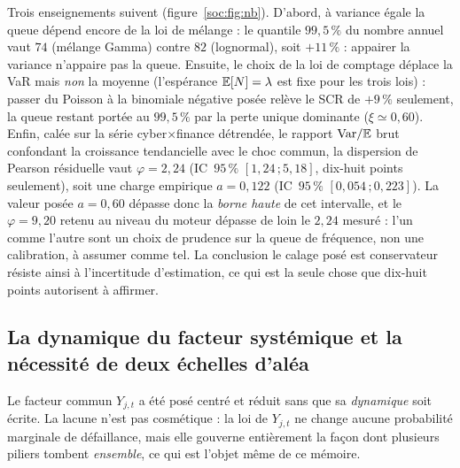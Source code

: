 Trois enseignements suivent (figure~\ref{soc:fig:nb}). D'abord, à variance égale la queue
dépend encore de la loi de mélange : le quantile $99{,}5\,\%$ du nombre annuel vaut $74$
(mélange Gamma) contre $82$ (lognormal), soit $+11\,\%$ : appairer la variance n'appaire pas
la queue. Ensuite, le choix de la loi de comptage déplace la VaR mais \emph{non} la moyenne
(l'espérance $\mathbb{E}[N]=\lambda$ est fixe pour les trois lois) : passer du Poisson à la binomiale
négative posée relève le SCR de $+9\,\%$ seulement, la queue restant portée au $99{,}5\,\%$ par
la perte unique dominante ($\xi\simeq 0{,}60$). Enfin, calée sur la série cyber$\times$finance
détrendée, le rapport $\mathrm{Var}/\mathbb{E}$ brut confondant la croissance tendancielle avec le choc
commun, la dispersion de Pearson résiduelle vaut $\varphi=2{,}24$
(IC~$95\,\%$ $[1{,}24\,;5{,}18]$, dix-huit points seulement), soit une charge empirique
$a=0{,}122$ (IC~$95\,\%$ $[0{,}054\,;0{,}223]$). La valeur posée $a=0{,}60$ dépasse donc la
\emph{borne haute} de cet intervalle, et le $\varphi=9{,}20$ retenu au niveau du moteur
dépasse de loin le $2{,}24$ mesuré : l'un comme l'autre sont un choix de prudence sur
la queue de fréquence, non une calibration, à assumer comme tel. La conclusion
\og{}le calage posé est conservateur\fg{} résiste ainsi à l'incertitude d'estimation, ce qui
est la seule chose que dix-huit points autorisent à affirmer.

\subsection{La dynamique du facteur systémique et la nécessité de deux échelles d'aléa}
\label{sec:dynamique-Y}

Le facteur commun $Y_{j,t}$ a été posé centré et réduit sans que sa \emph{dynamique} soit
écrite. La lacune n'est pas cosmétique : la loi de $Y_{j,t}$ ne change aucune probabilité
marginale de défaillance, mais elle gouverne entièrement la façon dont plusieurs piliers
tombent \emph{ensemble}, ce qui est l'objet même de ce mémoire.

